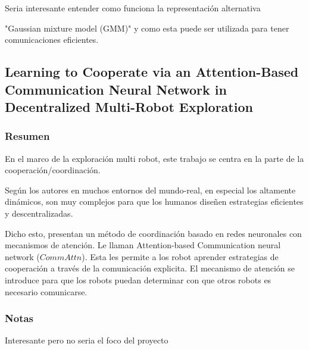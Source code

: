 Seria interesante entender como funciona la representación alternativa

"Gaussian mixture model (GMM)" y como esta puede ser utilizada para tener comunicaciones eficientes.

\subsection[Learning to Cooperate via an Attention-Based Communication Neural Network in Decentralized Multi-Robot Exploration]{Learning to Cooperate via an Attention-Based\\ Communication Neural Network in Decentralized Multi-Robot Exploration}

\subsubsection{Resumen}
En el marco de la exploración multi robot, este trabajo se centra en la parte de la cooperación/coordinación. 

Según los autores en muchos entornos del mundo-real, en especial los altamente dinámicos, son muy complejos para que los humanos diseñen estrategias eficientes y descentralizadas.

Dicho esto, presentan un método de coordinación basado en redes neuronales con mecanismos de atención. Le llaman Attention-based Communication neural network ($CommAttn$). Esta les permite a los robot aprender estrategias de cooperación a través de la comunicación explicita. El mecanismo de atención se introduce para que los robots puedan determinar con que otros robots es necesario comunicarse.

\subsubsection{Notas}
Interesante pero no seria el foco del proyecto



